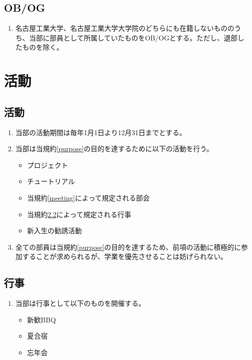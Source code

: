 \documentclass[12pt, unicode, a4paper]{ltjsreport}
\begin{document}
    \section{OB/OG}
        \begin{enumerate}
            \item 名古屋工業大学、名古屋工業大学大学院のどちらにも在籍しないもののうち、当部に部員として所属していたものをOB/OGとする。ただし、退部したものを除く。
        \end{enumerate}


\chapter{活動}
    \section{活動}\label{activity}
        \begin{enumerate}
            \item 当部の活動期間は毎年1月1日より12月31日までとする。
            \item 当部は当規約\ref{purpose}の目的を達するために以下の活動を行う。
            \begin{itemize}
                \item プロジェクト
                \item チュートリアル
                \item 当規約\ref{meeting}によって規定される部会
                \item 当規約\ref{event}によって規定される行事
                \item 新入生の勧誘活動
            \end{itemize}
            \item 全ての部員は当規約\ref{purpose}の目的を達するため、前項の活動に積極的に参加することが求められるが、学業を優先させることは妨げられない。
        \end{enumerate}

    \section{行事}\label{event}
        \begin{enumerate}
            \item 当部は行事として以下のものを開催する。
            \begin{itemize}
                \item 新歓BBQ
                \item 夏合宿
                \item 忘年会
            \end{itemize}
        \end{enumerate}
\end{document}
